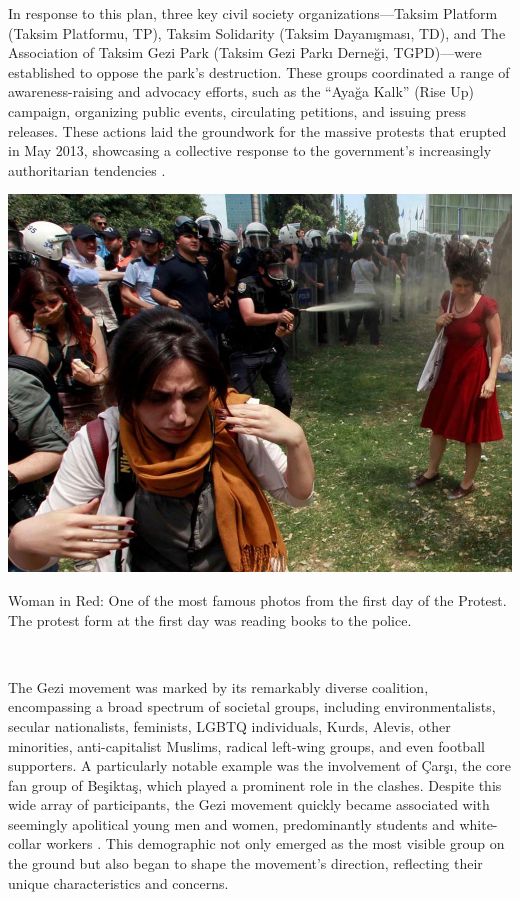 In response to this plan, three key civil society organizations—Taksim Platform (Taksim Platformu, TP), Taksim Solidarity (Taksim Dayanışması, TD), and The Association of Taksim Gezi Park (Taksim Gezi Parkı Derneği, TGPD)—were established to oppose the park’s destruction. These groups coordinated a range of awareness-raising and advocacy efforts, such as the “Ayağa Kalk” (Rise Up) campaign, organizing public events, circulating petitions, and issuing press releases. These actions laid the groundwork for the massive protests that erupted in May 2013, showcasing a collective response to the government’s increasingly authoritarian tendencies \parencite[213]{defneover2017}.

\begin{marginfigure}

  \includegraphics[scale=0.15]{Day1_1.jpg}
  \caption{Woman in Red: One of the most famous photos from the first day of the Protest. The protest form at the first day was reading books to the police.}\\
\end{marginfigure}

The Gezi movement was marked by its remarkably diverse coalition, encompassing a broad spectrum of societal groups, including environmentalists, secular nationalists, feminists, LGBTQ individuals, Kurds, Alevis, other minorities, anti-capitalist Muslims, radical left-wing groups, and even football supporters. A particularly notable example was the involvement of Çarşı, the core fan group of Beşiktaş, which played a prominent role in the clashes. Despite this wide array of participants, the Gezi movement quickly became associated with seemingly apolitical young men and women, predominantly students and white-collar workers \parencite[202]{agartan2018}. This demographic not only emerged as the most visible group on the ground but also began to shape the movement's direction, reflecting their unique characteristics and concerns.

